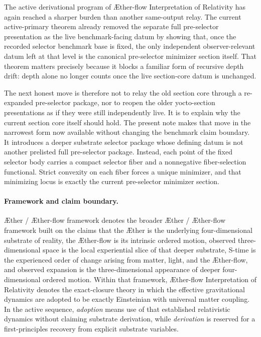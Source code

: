 \documentclass[11pt]{article}
\newcommand{\Aether}{\AE{}ther}
\newcommand{\Aflow}{\AE{}ther-flow}
\newcommand{\TheoryName}{\Aflow{} Interpretation of Relativity}
\newcommand{\TheoryProgram}{\Aether{} / \Aflow{} framework}
\begin{document}
The active derivational program of \TheoryName{} has again reached a sharper burden than another same-output relay. The current active-primary theorem already removed the separate full pre-selector presentation as the live benchmark-facing datum by showing that, once the recorded selector benchmark base is fixed, the only independent observer-relevant datum left at that level is the canonical pre-selector minimizer section itself. That theorem matters precisely because it blocks a familiar form of recursive depth drift: depth alone no longer counts once the live section-core datum is unchanged.

The next honest move is therefore not to relay the old section core through a re-expanded pre-selector package, nor to reopen the older yocto-section presentations as if they were still independently live. It is to explain why the current section core itself should hold. The present note makes that move in the narrowest form now available without changing the benchmark claim boundary. It introduces a deeper substrate selector package whose defining datum is not another prelisted full pre-selector package. Instead, each point of the fixed selector body carries a compact selector fiber and a nonnegative fiber-selection functional. Strict convexity on each fiber forces a unique minimizer, and that minimizing locus is exactly the current pre-selector minimizer section.

\paragraph{Framework and claim boundary.}
\TheoryProgram{} denotes the broader \Aether{} / \Aflow{} framework built on the claims that the \Aether{} is the underlying four-dimensional substrate of reality, the \Aflow{} is its intrinsic ordered motion, observed three-dimensional space is the local experiential slice of that deeper substrate, S-time is the experienced order of change arising from matter, light, and the \Aflow{}, and observed expansion is the three-dimensional appearance of deeper four-dimensional ordered motion. Within that framework, \TheoryName{} denotes the exact-closure theory in which the effective gravitational dynamics are adopted to be exactly Einsteinian with universal matter coupling. In the active sequence, \emph{adoption} means use of that established relativistic dynamics without claiming substrate derivation, while \emph{derivation} is reserved for a first-principles recovery from explicit substrate variables.
\end{document}
